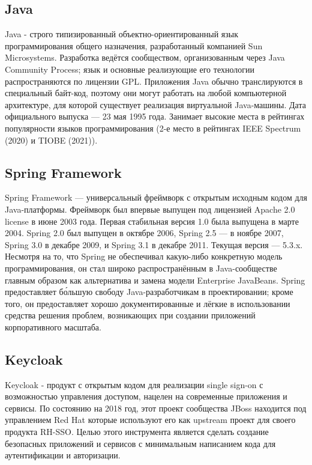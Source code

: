 
    \subsection*{Java}
        Java - строго типизированный объектно-ориентированный язык программирования общего назначения, разработанный компанией Sun Microsystems. Разработка ведётся сообществом, организованным через Java Community Process; язык и основные реализующие его технологии распространяются по лицензии GPL. Приложения Java обычно транслируются в специальный байт-код, поэтому они могут работать на любой компьютерной архитектуре, для которой существует реализация виртуальной Java-машины. Дата официального выпуска — 23 мая 1995 года. Занимает высокие места в рейтингах популярности языков программирования (2-е место в рейтингах IEEE Spectrum (2020) и TIOBE (2021)).

    \subsection*{Spring Framework}
        Spring Framework — универсальный фреймворк с открытым исходным кодом для Java-платформы. Фреймворк был впервые выпущен под лицензией Apache 2.0 license в июне 2003 года. Первая стабильная версия 1.0 была выпущена в марте 2004. Spring 2.0 был выпущен в октябре 2006, Spring 2.5 — в ноябре 2007, Spring 3.0 в декабре 2009, и Spring 3.1 в декабре 2011. Текущая версия — 5.3.x. Несмотря на то, что Spring не обеспечивал какую-либо конкретную модель программирования, он стал широко распространённым в Java-сообществе главным образом как альтернатива и замена модели Enterprise JavaBeans. Spring предоставляет бо́льшую свободу Java-разработчикам в проектировании; кроме того, он предоставляет хорошо документированные и лёгкие в использовании средства решения проблем, возникающих при создании приложений корпоративного масштаба.

    \subsection*{Keycloak}
        Keycloak - продукт с открытым кодом для реализации single sign-on с возможностью управления доступом, нацелен на современные приложения и сервисы. По состоянию на 2018 год, этот проект сообщества JBoss находится под управлением Red Hat которые используют его как upstream проект для своего продукта RH-SSO. Целью этого инструмента является сделать создание безопасных приложений и сервисов с минимальным написанием кода для аутентификации и авторизации. 

